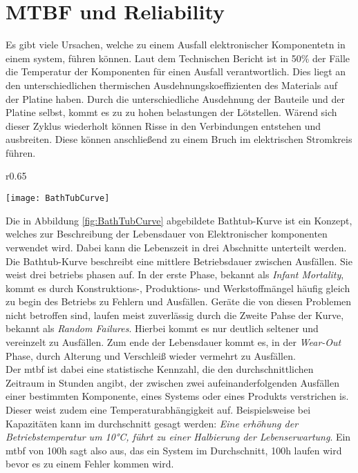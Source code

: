 \section{MTBF und Reliability}
Es gibt viele Ursachen, welche zu einem Ausfall elektronischer Komponentetn in einem system, führen können. Laut dem Technischen Bericht \cite{AIP} ist in 50\% der Fälle die Temperatur der Komponenten für einen Ausfall verantwortlich. Dies liegt an den unterschiedlichen thermischen Ausdehnungskoeffizienten des Materials auf der Platine haben. Durch die unterschiedliche Ausdehnung der Bauteile und der Platine selbst, kommt es zu zu hohen belastungen der Lötstellen. Wärend sich dieser Zyklus wiederholt  können Risse in den Verbindungen entstehen und ausbreiten. Diese können anschließend zu einem Bruch im elektrischen Stromkreis führen. \cite{AREPA_LifeExpectancy}\\
\begin{wrapfigure}{r}{0.65\textwidth}
    \vspace{-1.2cm}
    \begin{center}
      \texttt{[image: BathTubCurve]}
    \end{center}
    \vspace{-0.5cm}
    \caption{Bathtub Curve \cite{AREPA_LifeExpectancy}}
    \label{fig:BathTubCurve}
    \vspace{-0.5cm}
  \end{wrapfigure}
Die in Abbildung \ref{fig:BathTubCurve} abgebildete Bathtub-Kurve ist ein Konzept, welches zur Beschreibung der Lebensdauer von Elektronischer komponenten verwendet wird. Dabei kann die Lebenszeit in drei Abschnitte unterteilt werden. Die Bathtub-Kurve beschreibt eine mittlere Betriebsdauer zwischen Ausfällen. Sie weist drei betriebs phasen auf. 
In der erste Phase, bekannt als \textit{Infant Mortality}, kommt es durch Konstruktions-, Produktions- und Werkstoffmängel häufig gleich zu begin des Betriebs zu Fehlern und Ausfällen. Geräte die von diesen Problemen nicht betroffen sind, laufen meist zuverlässig durch die Zweite Pahse der Kurve, bekannt als \textit{Random Failures}. Hierbei kommt es nur deutlich seltener und vereinzelt zu Ausfällen. Zum ende der Lebensdauer kommt es, in der \textit{Wear-Out} Phase, durch Alterung und Verschleiß wieder vermehrt zu Ausfällen. \cite{AREPA_LifeExpectancy}\\ 
Der \ac{mtbf} ist dabei eine statistische Kennzahl, die den durchschnittlichen Zeitraum in Stunden angibt, der zwischen zwei aufeinanderfolgenden Ausfällen einer bestimmten Komponente, eines Systems oder eines Produkts verstrichen is. Dieser weist zudem eine Temperaturabhängigkeit auf. Beispielsweise bei Kapazitäten kann im durchschnitt gesagt werden: \textit{Eine erhöhung der Betriebstemperatur um 10°C, führt zu einer Halbierung der Lebenserwartung}. Ein \ac{mtbf} von 100h sagt also aus, das ein System im Durchschnitt, 100h laufen wird bevor es zu einem Fehler kommen wird.\cite{MTBFReliability}\\
